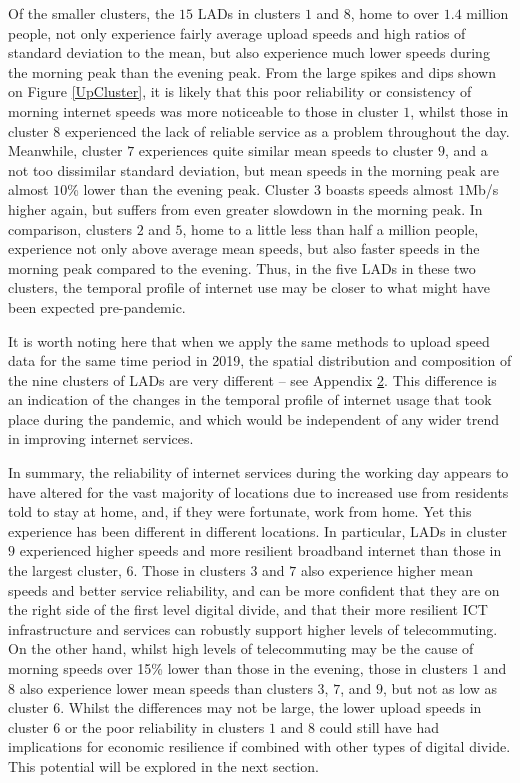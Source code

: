 \documentclass[]{interact}
\theoremstyle{plain}%
\theoremstyle{definition}
\theoremstyle{remark}
\begin{document}
Of the smaller clusters, the \(15\) LADs in clusters \(1\) and \(8\),
home to over \(1.4\) million people, not only experience fairly average
upload speeds and high ratios of standard deviation to the mean, but
also experience much lower speeds during the morning peak than the
evening peak. From the large spikes and dips shown on Figure
\ref{UpCluster}, it is likely that this poor reliability or consistency
of morning internet speeds was more noticeable to those in cluster
\(1\), whilst those in cluster \(8\) experienced the lack of reliable
service as a problem throughout the day. Meanwhile, cluster \(7\)
experiences quite similar mean speeds to cluster \(9\), and a not too
dissimilar standard deviation, but mean speeds in the morning peak are
almost \(10\)\% lower than the evening peak. Cluster \(3\) boasts speeds
almost \(1\)Mb/s higher again, but suffers from even greater slowdown in
the morning peak. In comparison, clusters \(2\) and \(5\), home to a
little less than half a million people, experience not only above
average mean speeds, but also faster speeds in the morning peak compared
to the evening. Thus, in the five LADs in these two clusters, the
temporal profile of internet use may be closer to what might have been
expected pre-pandemic.

It is worth noting here that when we apply the same methods to upload
speed data for the same time period in 2019, the spatial distribution
and composition of the nine clusters of LADs are very different -- see
Appendix \protect\hyperlink{appendix2}{2}. This difference is an
indication of the changes in the temporal profile of internet usage that
took place during the pandemic, and which would be independent of any
wider trend in improving internet services.

In summary, the reliability of internet services during the working day
appears to have altered for the vast majority of locations due to
increased use from residents told to stay at home, and, if they were
fortunate, work from home. Yet this experience has been different in
different locations. In particular, LADs in cluster \(9\) experienced
higher speeds and more resilient broadband internet than those in the
largest cluster, \(6\). Those in clusters \(3\) and \(7\) also
experience higher mean speeds and better service reliability, and can be
more confident that they are on the right side of the first level
digital divide, and that their more resilient ICT infrastructure and
services can robustly support higher levels of telecommuting. On the
other hand, whilst high levels of telecommuting may be the cause of
morning speeds over 15\% lower than those in the evening, those in
clusters \(1\) and \(8\) also experience lower mean speeds than clusters
\(3\), \(7\), and \(9\), but not as low as cluster \(6\). Whilst the
differences may not be large, the lower upload speeds in cluster \(6\)
or the poor reliability in clusters \(1\) and \(8\) could still have had
implications for economic resilience if combined with other types of
digital divide. This potential will be explored in the next section.
\end{document}
